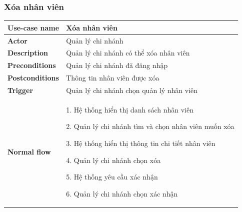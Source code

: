         \subsubsection{Xóa nhân viên}
            \begin{longtable}{| p{} | p{} |} 
                \hline
                    \textbf{Use-case name} 
                & 
                    Xóa nhân viên
                \\
                \hline
                    \textbf{Actor} 
                & 
                    Quản lý chi nhánh
                \\
                \hline
                    \textbf{Description} 
                & 
                    Quản lý chi nhánh có thể xóa nhân viên
                \\
                \hline
                    \textbf{Preconditions} 
                &
                    Quản lý chi nhánh đã đăng nhập
                \\
                \hline
                    \textbf{Postconditions} 
                & 
                    Thông tin nhân viên được xóa
                \\
                \hline
                    \textbf{Trigger} 
                & 
                    Quản lý chi nhánh chọn quản lý nhân viên
                \\
                \hline
                \begin{flushleft}
                    \textbf{Normal flow}
                \end{flushleft}
                & 
                    1. Hệ thống hiển thị danh sách nhân viên
                    
                    2. Quản lý chi nhánh tìm và chọn nhân viên muốn xóa
                    
                    3. Hệ thống hiển thị thông tin chi tiết nhân viên
                    
                    4. Quản lý chi nhánh chọn xóa
                    
                    5. Hệ thống yêu cầu xác nhận
                    
                    6. Quản lý chi nhánh chọn xác nhận
                    

\end{longtable}
